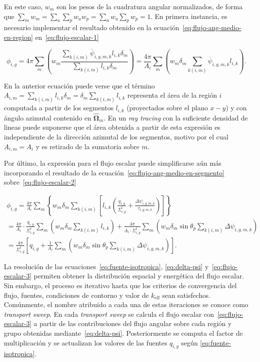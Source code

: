 \documentclass[11pt]{article}
\numberwithin{equation}{section}
\begin{document}
\noindent
En este caso, $w_m$ son los pesos de la cuadratura angular normalizados, de forma que $\sum_m w_m = \sum_a \sum_p w_a w_p = \sum_a w_a \sum_p w_p = 1$. En primera instancia, es necesario implementar el resultado obtenido en la ecuación~\eqref{eq:flujo-ang-medio-en-region} en~\eqref{eq:flujo-escalar-1}

\begin{equation} \label{eq:flujo-escalar-2}
 \phi_{i,g} =
 4\pi \sum_m \left( w_m \frac{\sum_{k(i,m)} \overline{\psi}_{i,g,m,k} l_{i,k} \delta_m}{\sum_{k(i,m)} l_{i,k} \delta_m} \right) = 
 \frac{4\pi}{A_i} \sum_m \left( w_m \delta_m \sum_{k(i,m)} \overline{\psi}_{i,g,m,k} l_{i,k} \right).
\end{equation}

\noindent
En la anterior ecuación puede verse que el t\'ermino $A_{i,m} = \sum_{k(i,m)} l_{i,k} \delta_m = \delta_m \sum_{k(i,m)} l_{i,k}$ representa el área de la región $i$ computada a partir de los segmentos $l_{i,k}$ (proyectados sobre el plano $x - y$) y con ángulo azimutal contenido en $\boldsymbol{\hat{\Omega}}_m$. En un \emph{ray tracing} con la suficiente densidad de lineas puede suponerse que el área obtenida a partir de esta expresi\'on es independiente de la dirección azimutal de los segmentos, motivo por el cual $A_{i,m} = A_i$ y es retirado de la sumatoria sobre $m$.

Por último, la expresi\'on para el flujo escalar puede simplificarse aún m\'as incorporando el resultado de la ecuación~\eqref{eq:flujo-ang-medio-en-segmento} sobre~\eqref{eq:flujo-escalar-2}

\begin{multline} \label{eq:flujo-escalar-3}
 \phi_{i,g} =
 \frac{4\pi}{A_i} \sum_m \left\lbrace w_m \delta_m \sum_{k(i,m)} \left[ l_{i,k} \left( \frac{q_{i,g}}{\Sigma^t_{i,g}} + \frac{\Delta \psi_{i,g,m,k}}{\tau_{i,g,m,k}} \right) \right] \right\rbrace \\ 
 = \frac{4\pi}{A_i} \cdot \frac{q_{i,g}}{\Sigma^t_{i,g}} \sum_m \left( w_m \delta_m \sum_{k(i,m)} l_{i,k} \right) + \frac{4\pi}{A_i \cdot \Sigma^t_{i,g}} \sum_m \left( w_m \delta_m \sin \theta_p \sum_{k(i,m)} \Delta \psi_{i,g,m,k} \right) \\ 
 = \frac{4\pi}{\Sigma^t_{i,g}} \left[ q_{i,g} + \frac{1}{A_i} \sum_m \left( w_m \delta_m \sin \theta_p \sum_{k(i,m)} \Delta \psi_{i,g,m,k} \right) \right]
 .
\end{multline}

La resolución de las ecuaciones~\eqref{eq:fuente-isotropica}, \eqref{eq:delta-psi} y~\eqref{eq:flujo-escalar-3} permiten obtener la distribución espacial y energética del flujo escalar. Sin embargo, el proceso es iterativo hasta que los criterios de convergencia del flujo, fuentes, condiciones de contorno y valor de $k_{\text{eff}}$ sean satisfechos. Comúnmente, el nombre atribuido a cada una de estas iteraciones se conoce como \emph{transport sweep}. En cada \emph{transport sweep} se calcula el flujo escalar con~\eqref{eq:flujo-escalar-3} a partir de las contribuciones del flujo angular sobre cada región y grupo obtenidas mediante~\eqref{eq:delta-psi}. Posteriormente se computa el factor de multiplicación y se actualizan los valores de las fuentes $q_{i,g}$ seg\'un \eqref{eq:fuente-isotropica}.
\end{document}
